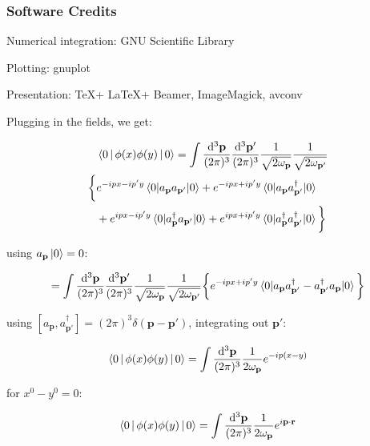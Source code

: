 \documentclass{beamer}
\newcommand{\vp}{\mathbf{p}}
\newcommand{\vr}{\mathbf{r}}
\newcommand{\vpp}{\mathbf{p}'}
\newcommand{\omvp}{\omega_{\vp}}
\newcommand{\omvpp}{\omega_{\vpp}}
\newcommand{\ap}{a_{\vp}}
\newcommand{\app}{a_{\vpp}}
\newcommand{\adp}{a^\dagger_{\vp}}
\newcommand{\adpp}{a^\dagger_{\vpp}}
\newcommand{\diffop}{\mathop{}\!\mathrm{d}}
\newcommand{\bysqrt}[1]{\frac{1}{\sqrt{#1}}}
\newcommand{\intpthree}{\int \frac{\diffop^3\vp}{(2\pi)^3}}
\newcommand{\intpthreeppthree}{\int \frac{\diffop^3\vp}{(2\pi)^3} \frac{\diffop^3\vpp}{(2\pi)^3}}
\newcommand{\com}[2]{[{#1},{#2}]}
\newcommand{\phixy}{\Braket{0|\phi(x)\phi(y)|0}}
\begin{document}


\begin{frame}
\frametitle{Software Credits}

Numerical integration: GNU Scientific Library

Plotting: gnuplot

Presentation: \TeX + \LaTeX + Beamer, ImageMagick, avconv
\end{frame}





\begin{frame}
Plugging in the fields, we get:

\begin{equation*}
\begin{split}
& \phixy = \intpthreeppthree \bysqrt{2\omvp} \bysqrt{2\omvpp} \\
\bigg\{ & e^{-ipx-ip'y} \braket{0|\ap\app|0} + e^{-ipx+ip'y} \braket{0|\ap\adpp|0} \\
        & + e^{ipx-ip'y} \braket{0|\adp\app|0} + e^{ipx+ip'y} \braket{0|\adp\adpp|0} \bigg\}
\end{split}
\end{equation*}

using $\ap\ket{0} = 0$:

\begin{equation*}
= \intpthreeppthree \bysqrt{2\omvp} \bysqrt{2\omvpp}
\bigg\{ e^{-ipx+ip'y} \braket{0|\ap\adpp - \adpp\ap|0} \bigg\}
\end{equation*}
\end{frame}


\begin{frame}
using $\com{\ap}{\adpp} = (2\pi)^3 \delta(\vp - \vpp)$, integrating out $\vpp$:

\begin{equation*}
\phixy = \intpthree \frac{1}{2\omvp} e^{-ip(x-y)}
\end{equation*}

for $x^0 - y^0 = 0$:

\begin{equation*}
\phixy = \intpthree \frac{1}{2\omvp} e^{i\vp\cdot\vr}
\end{equation*}
\end{frame}
\end{document}
